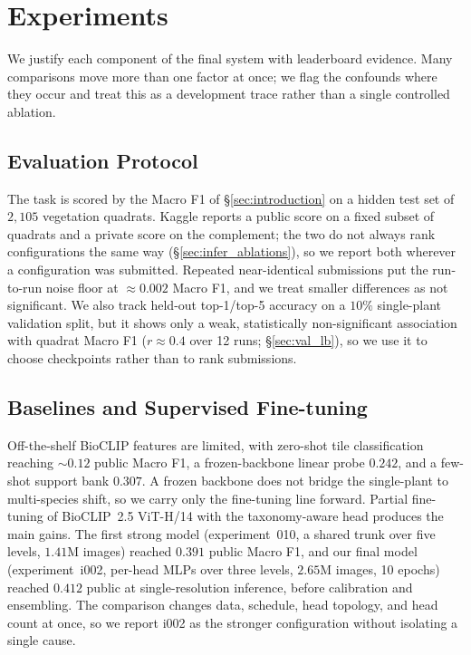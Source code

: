 \chapter{Experiments}
\label{sec:experiments}

We justify each component of the final system with leaderboard evidence. Many comparisons move more than one factor at once; we flag the confounds where they occur and treat this as a development trace rather than a single controlled ablation.

\section{Evaluation Protocol}
\label{sec:eval_protocol}

The task is scored by the Macro F1 of \S\ref{sec:introduction} on a hidden test set of $2{,}105$ vegetation quadrats. Kaggle reports a public score on a fixed subset of quadrats and a private score on the complement; the two do not always rank configurations the same way (\S\ref{sec:infer_ablations}), so we report both wherever a configuration was submitted. Repeated near-identical submissions put the run-to-run noise floor at $\approx 0.002$ Macro F1, and we treat smaller differences as not significant. We also track held-out top-1/top-5 accuracy on a $10\%$ single-plant validation split, but it shows only a weak, statistically non-significant association with quadrat Macro F1 ($r\approx0.4$ over 12 runs; \S\ref{sec:val_lb}), so we use it to choose checkpoints rather than to rank submissions.

\section{Baselines and Supervised Fine-tuning}

Off-the-shelf BioCLIP features are limited, with zero-shot tile classification reaching ${\sim}0.12$ public Macro F1, a frozen-backbone linear probe $0.242$, and a few-shot support bank $0.307$. A frozen backbone does not bridge the single-plant to multi-species shift, so we carry only the fine-tuning line forward. Partial fine-tuning of BioCLIP~2.5 ViT-H/14 with the taxonomy-aware head produces the main gains. The first strong model (experiment~010, a shared trunk over five levels, $1.41$M images) reached $0.391$ public Macro F1, and our final model (experiment~i002, per-head MLPs over three levels, $2.65$M images, 10 epochs) reached $0.412$ public at single-resolution inference, before calibration and ensembling. The comparison changes data, schedule, head topology, and head count at once, so we report i002 as the stronger configuration without isolating a single cause.

